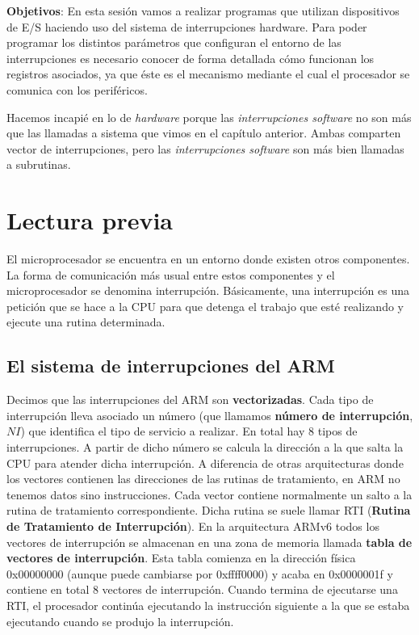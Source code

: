 

\label{chp:Interrupciones}
\minitoc

{\bf Objetivos}: En esta sesión vamos a realizar programas que
utilizan dispositivos de E/S haciendo uso del sistema de
interrupciones hardware. Para poder programar los distintos parámetros
que configuran el entorno de las interrupciones es necesario conocer de
forma detallada cómo funcionan los registros asociados, ya que
éste es el mecanismo mediante el cual el procesador se
comunica con los periféricos.

Hacemos incapié en lo de {\it hardware} porque las
{\it interrupciones software} no son más que las llamadas a sistema
que vimos en el capítulo anterior. Ambas comparten vector de interrupciones,
pero las {\it interrupciones software} son más bien llamadas a subrutinas.

\section{Lectura previa}

El microprocesador se encuentra en un entorno donde existen otros
componentes. La forma de comunicación más usual entre estos
componentes y el microprocesador se denomina interrupción.
Básicamente, una interrupción es una petición que se hace a la CPU
para que detenga el trabajo que esté realizando y ejecute una rutina
determinada. 

\subsection{El sistema de interrupciones del ARM}

Decimos que las interrupciones del ARM son {\bf vectorizadas}.
Cada tipo de interrupción lleva asociado un número (que llamamos
{\bf número de interrupción}, $NI$) que identifica el tipo de servicio a
realizar. En total hay 8 tipos de interrupciones.
A partir de dicho número se calcula la dirección a la que salta la CPU
para atender dicha interrupción. A diferencia de otras arquitecturas
donde los vectores contienen las direcciones de las rutinas de
tratamiento, en ARM no tenemos datos sino instrucciones. Cada vector
contiene normalmente un salto a la rutina de tratamiento correspondiente.
Dicha rutina se suele llamar RTI ({\bf Rutina
de Tratamiento de Interrupción}). En la arquitectura ARMv6
todos los vectores de interrupción se almacenan en una zona de memoria
llamada {\bf tabla de vectores de interrupción}. Esta tabla comienza
en la dirección física 0x00000000 (aunque puede cambiarse por
0xffff0000) y acaba en 0x0000001f y contiene en total 8 vectores de
interrupción. Cuando termina de ejecutarse una RTI,
el procesador continúa ejecutando la instrucción siguiente a la que se
estaba ejecutando cuando se produjo la interrupción.

